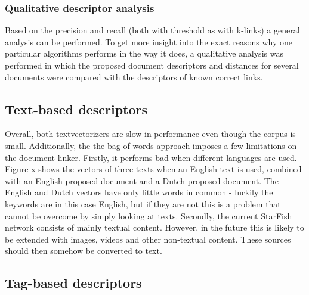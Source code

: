 \subsubsection{Qualitative descriptor analysis}
Based on the precision and recall (both with threshold as with k-links) a general analysis can be performed. To get more insight into the exact reasons why one particular algorithms performs in the way it does, a qualitative analysis was performed in which the proposed document descriptors and distances for several documents were compared with the descriptors of known correct links. 

\subsection{Text-based descriptors}
Overall, both textvectorizers are slow in performance even though the corpus is small. Additionally, the the bag-of-words approach imposes a few limitations on the document linker. Firstly, it performs bad when different languages are used. Figure x shows the vectors of three texts when an English text is used, combined with an English proposed document and a Dutch proposed document. The English and Dutch vectors have only little words in common - luckily the keywords are in this case English, but if they are not this is a problem that cannot be overcome by simply looking at texts. Secondly, the current StarFish network consists of mainly textual content. However, in the future this is likely to be extended with images, videos and other non-textual content. These sources should then somehow be converted to text.



\subsection{Tag-based descriptors}

